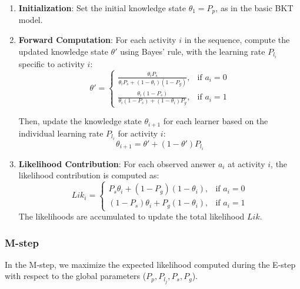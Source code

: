\documentclass{article}
\begin{document}
\begin{enumerate}
    \item \textbf{Initialization}:
    Set the initial knowledge state \(\theta_1 = P_p\), as in the basic BKT model.
    
    \item \textbf{Forward Computation}:
    For each activity \(i\) in the sequence, compute the updated knowledge state \(\theta'\) using Bayes' rule, with the learning rate \(P_{l_i}\) specific to activity \(i\):
    \[
    \theta' = 
    \begin{cases} 
        \frac{\theta_i P_s}{\theta_i P_s + (1 - \theta_i)(1 - P_g)}, & \text{if } a_i = 0 \\
        \frac{\theta_i (1 - P_s)}{\theta_i (1 - P_s) + (1 - \theta_i)P_g}, & \text{if } a_i = 1
    \end{cases}
    \]
    
    Then, update the knowledge state \(\theta_{i+1}\) for each learner based on the individual learning rate \(P_{l_i}\) for activity \(i\):
    \[
    \theta_{i+1} = \theta' + (1 - \theta') P_{l_i}
    \]
    
    \item \textbf{Likelihood Contribution}:
    For each observed answer \(a_i\) at activity \(i\), the likelihood contribution is computed as:
    \[
    Lik_i = 
    \begin{cases} 
        P_s \theta_i + (1 - P_g)(1 - \theta_i), & \text{if } a_i = 0 \\
        (1 - P_s)\theta_i + P_g(1 - \theta_i), & \text{if } a_i = 1
    \end{cases}
    \]
    The likelihoods are accumulated to update the total likelihood \(Lik\).
\end{enumerate}

\subsubsection{M-step}
In the M-step, we maximize the expected likelihood computed during the E-step with respect to the global parameters (\(P_p, P_{l_j}, P_s, P_g\)).
\end{document}
